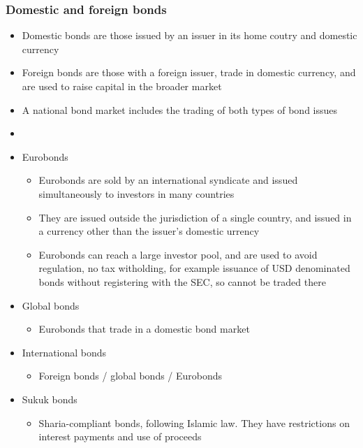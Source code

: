 \documentclass[../notes_compiled.tex]{subfiles}
\begin{document}
\subsubsection{Domestic and foreign bonds}
\begin{itemize}
\item Domestic bonds are those issued by an issuer in its home coutry and domestic currency
\item Foreign bonds are those with a foreign issuer, trade in domestic currency, and are used to raise capital in the broader market
\item A national bond market includes the trading of both types of bond issues
\item[]
\item Eurobonds
\begin{itemize}
\item Eurobonds are sold by an international syndicate and issued simultaneously to investors in many countries
\item They are issued outside the jurisdiction of a single country, and issued in a currency other than the issuer’s domestic urrency
\item Eurobonds can reach a large investor pool, and are used to avoid regulation, no tax witholding, for example  issuance of USD denominated bonds without registering with the SEC, so cannot be traded there
\end{itemize}
\item Global bonds
\begin{itemize}
\item Eurobonds that trade in a domestic bond market
\end{itemize}
\item International bonds
\begin{itemize}
\item Foreign bonds / global bonds / Eurobonds
\end{itemize}
\item Sukuk bonds
\begin{itemize}
\item Sharia-compliant bonds, following Islamic law. They have restrictions on interest payments and use of proceeds
\end{itemize}
\end{itemize}
\end{document}
